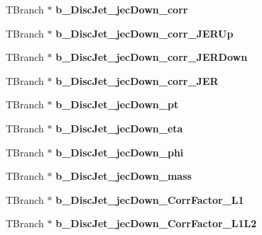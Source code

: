 \begin{DoxyCompactItemize}
\hypertarget{classMiniTree_a56995790a0d9591f20e86ab5aaa37ab7}{}\label{classMiniTree_a56995790a0d9591f20e86ab5aaa37ab7} 
T\+Branch $\ast$ {\bfseries b\+\_\+\+Disc\+Jet\+\_\+jec\+Down\+\_\+corr}
\item 
\hypertarget{classMiniTree_a4328a0690519870244b0efd87e6fc6dc}{}\label{classMiniTree_a4328a0690519870244b0efd87e6fc6dc} 
T\+Branch $\ast$ {\bfseries b\+\_\+\+Disc\+Jet\+\_\+jec\+Down\+\_\+corr\+\_\+\+J\+E\+R\+Up}
\item 
\hypertarget{classMiniTree_ae909150fd9b10331134f7859a11c3fec}{}\label{classMiniTree_ae909150fd9b10331134f7859a11c3fec} 
T\+Branch $\ast$ {\bfseries b\+\_\+\+Disc\+Jet\+\_\+jec\+Down\+\_\+corr\+\_\+\+J\+E\+R\+Down}
\item 
\hypertarget{classMiniTree_a438560cfac7798f78dd2feb6ba767e04}{}\label{classMiniTree_a438560cfac7798f78dd2feb6ba767e04} 
T\+Branch $\ast$ {\bfseries b\+\_\+\+Disc\+Jet\+\_\+jec\+Down\+\_\+corr\+\_\+\+J\+ER}
\item 
\hypertarget{classMiniTree_a6fa60da99c372bcfe3b4b4a6184a26d5}{}\label{classMiniTree_a6fa60da99c372bcfe3b4b4a6184a26d5} 
T\+Branch $\ast$ {\bfseries b\+\_\+\+Disc\+Jet\+\_\+jec\+Down\+\_\+pt}
\item 
\hypertarget{classMiniTree_af569580c8ad7860ce03b32641fb77148}{}\label{classMiniTree_af569580c8ad7860ce03b32641fb77148} 
T\+Branch $\ast$ {\bfseries b\+\_\+\+Disc\+Jet\+\_\+jec\+Down\+\_\+eta}
\item 
\hypertarget{classMiniTree_ac367298398ed91733e42c9ee7f3c6096}{}\label{classMiniTree_ac367298398ed91733e42c9ee7f3c6096} 
T\+Branch $\ast$ {\bfseries b\+\_\+\+Disc\+Jet\+\_\+jec\+Down\+\_\+phi}
\item 
\hypertarget{classMiniTree_a53f7ffdc48e78f9ee1c4e32cb8b6d75f}{}\label{classMiniTree_a53f7ffdc48e78f9ee1c4e32cb8b6d75f} 
T\+Branch $\ast$ {\bfseries b\+\_\+\+Disc\+Jet\+\_\+jec\+Down\+\_\+mass}
\item 
\hypertarget{classMiniTree_a3533b000876511a57439e950a23b3eab}{}\label{classMiniTree_a3533b000876511a57439e950a23b3eab} 
T\+Branch $\ast$ {\bfseries b\+\_\+\+Disc\+Jet\+\_\+jec\+Down\+\_\+\+Corr\+Factor\+\_\+\+L1}
\item 
\hypertarget{classMiniTree_a85a4c74eb29046fe65b08eefdf1fa83d}{}\label{classMiniTree_a85a4c74eb29046fe65b08eefdf1fa83d} 
T\+Branch $\ast$ {\bfseries b\+\_\+\+Disc\+Jet\+\_\+jec\+Down\+\_\+\+Corr\+Factor\+\_\+\+L1\+L2}
\item 
\hypertarget{classMiniTree_a92b182aa311321f0ec67b8c3241bed14}{}\label{classMiniTree_a92b182aa311321f0ec67b8c3241bed14} 

\end{DoxyCompactItemize}
